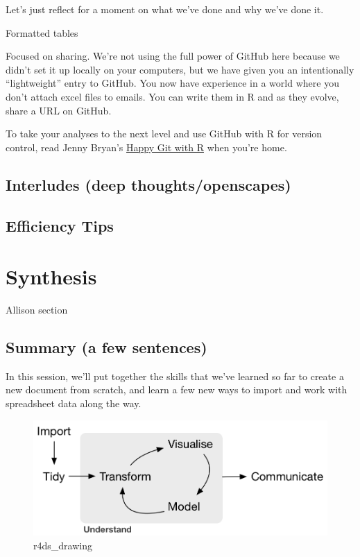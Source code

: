 \documentclass[]{book}
\begin{document}
Let's just reflect for a moment on what we've done and why we've done it.

Formatted tables

Focused on sharing. We're not using the full power of GitHub here because we didn't set it up locally on your computers, but we have given you an intentionally ``lightweight'' entry to GitHub. You now have experience in a world where you don't attach excel files to emails. You can write them in R and as they evolve, share a URL on GitHub.

To take your analyses to the next level and use GitHub with R for version control, read Jenny Bryan's \href{https://happygitwithr.com/}{Happy Git with R} when you're home.

\hypertarget{interludes-deep-thoughtsopenscapes-5}{%
\section{Interludes (deep thoughts/openscapes)}\label{interludes-deep-thoughtsopenscapes-5}}

\hypertarget{efficiency-tips-6}{%
\section{Efficiency Tips}\label{efficiency-tips-6}}

\hypertarget{synthesis}{%
\chapter{Synthesis}\label{synthesis}}

Allison section

\hypertarget{summary-a-few-sentences-5}{%
\section{Summary (a few sentences)}\label{summary-a-few-sentences-5}}

In this session, we'll put together the skills that we've learned so far to create a new document from scratch, and learn a few new ways to import and work with spreadsheet data along the way.

\begin{figure}
\centering
\includegraphics{img/r4ds_data-science.png}
\caption{r4ds\_drawing}
\end{figure}
\end{document}
